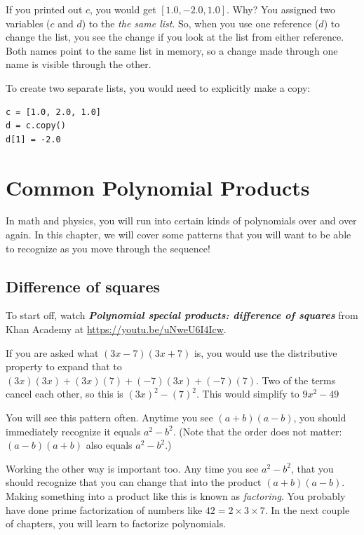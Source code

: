 If you printed out $c$, you would get $[1.0, -2.0, 1.0]$.  Why? You
assigned two variables ($c$ and $d$) to the \emph{the same list}.  So,
when you use one reference ($d$) to change the list, you see the
change if you look at the list from either reference. Both names point to the same list in memory, so a change made through one name is visible through the other.

To create two separate lists, you would need  to explicitly make a copy:
\begin{verbatim}
c = [1.0, 2.0, 1.0]
d = c.copy()
d[1] = -2.0
\end{verbatim}


\section{Common Polynomial Products}
In math and physics, you will run into certain kinds of polynomials
over and over again. In this chapter, we will cover some
patterns that you will want to be able to recognize as you move through the sequence!

\subsection{Difference of squares}

To start off, watch \textbf{\textit{Polynomial special products: difference of squares}} from Khan Academy at \url{https://youtu.be/uNweU6I4Icw}.

If you are asked what $(3x - 7)(3x + 7)$ is, you would use the
distributive property to expand that to $(3x)(3x) + (3x)(7) + (-7)(3x) + (-7)(7)$.
Two of the terms cancel each other, so this is $(3x)^2 - (7)^2$. This would simplify to $9x^2 - 49$

You will see this pattern often. Anytime you see $(a + b)(a - b)$, you should immediately
recognize it equals $a^2 - b^2$. (Note that the order does not matter: $(a - b)(a + b)$ also equals $a^2 - b^2$.)

Working the other way is important too. Any time you see $a^2 - b^2$,
that you should recognize that you can change that into the product
$(a + b)(a - b)$. Making something into a product like this is known as
\emph{factoring}. You probably have done prime factorization of
numbers like $42 = 2 \times 3 \times 7$. In the next couple of
chapters, you will learn to factorize polynomials.

